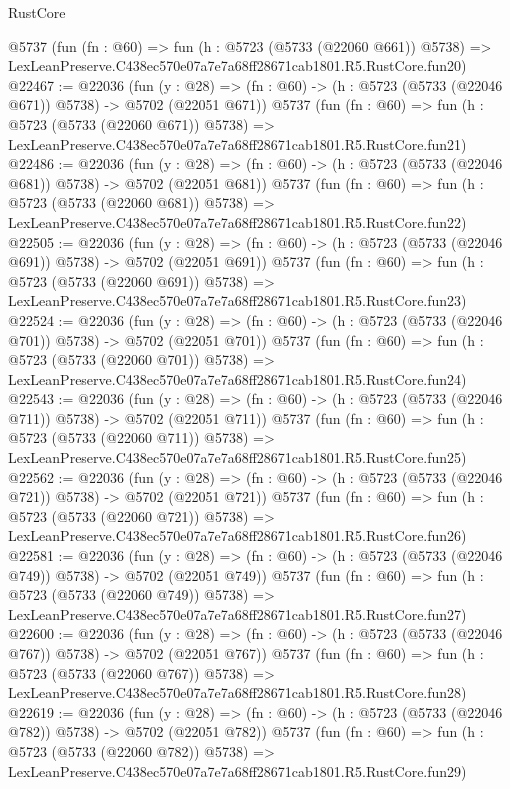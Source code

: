 \begin{lexlean}{RustCore}
\begin{coremodule}
    @5737
    (fun (fn : @60) =>
    fun (h : @5723 (@5733 (@22060 @661)) @5738) =>
    LexLeanPreserve.C438ec570e07a7e7a68ff28671cab1801.R5.RustCore.fun20)
@22467 := @22036
    (fun (y : @28) => (fn : @60) -> (h : @5723 (@5733 (@22046 @671)) @5738) -> @5702 (@22051 @671))
    @5737
    (fun (fn : @60) =>
    fun (h : @5723 (@5733 (@22060 @671)) @5738) =>
    LexLeanPreserve.C438ec570e07a7e7a68ff28671cab1801.R5.RustCore.fun21)
@22486 := @22036
    (fun (y : @28) => (fn : @60) -> (h : @5723 (@5733 (@22046 @681)) @5738) -> @5702 (@22051 @681))
    @5737
    (fun (fn : @60) =>
    fun (h : @5723 (@5733 (@22060 @681)) @5738) =>
    LexLeanPreserve.C438ec570e07a7e7a68ff28671cab1801.R5.RustCore.fun22)
@22505 := @22036
    (fun (y : @28) => (fn : @60) -> (h : @5723 (@5733 (@22046 @691)) @5738) -> @5702 (@22051 @691))
    @5737
    (fun (fn : @60) =>
    fun (h : @5723 (@5733 (@22060 @691)) @5738) =>
    LexLeanPreserve.C438ec570e07a7e7a68ff28671cab1801.R5.RustCore.fun23)
@22524 := @22036
    (fun (y : @28) => (fn : @60) -> (h : @5723 (@5733 (@22046 @701)) @5738) -> @5702 (@22051 @701))
    @5737
    (fun (fn : @60) =>
    fun (h : @5723 (@5733 (@22060 @701)) @5738) =>
    LexLeanPreserve.C438ec570e07a7e7a68ff28671cab1801.R5.RustCore.fun24)
@22543 := @22036
    (fun (y : @28) => (fn : @60) -> (h : @5723 (@5733 (@22046 @711)) @5738) -> @5702 (@22051 @711))
    @5737
    (fun (fn : @60) =>
    fun (h : @5723 (@5733 (@22060 @711)) @5738) =>
    LexLeanPreserve.C438ec570e07a7e7a68ff28671cab1801.R5.RustCore.fun25)
@22562 := @22036
    (fun (y : @28) => (fn : @60) -> (h : @5723 (@5733 (@22046 @721)) @5738) -> @5702 (@22051 @721))
    @5737
    (fun (fn : @60) =>
    fun (h : @5723 (@5733 (@22060 @721)) @5738) =>
    LexLeanPreserve.C438ec570e07a7e7a68ff28671cab1801.R5.RustCore.fun26)
@22581 := @22036
    (fun (y : @28) => (fn : @60) -> (h : @5723 (@5733 (@22046 @749)) @5738) -> @5702 (@22051 @749))
    @5737
    (fun (fn : @60) =>
    fun (h : @5723 (@5733 (@22060 @749)) @5738) =>
    LexLeanPreserve.C438ec570e07a7e7a68ff28671cab1801.R5.RustCore.fun27)
@22600 := @22036
    (fun (y : @28) => (fn : @60) -> (h : @5723 (@5733 (@22046 @767)) @5738) -> @5702 (@22051 @767))
    @5737
    (fun (fn : @60) =>
    fun (h : @5723 (@5733 (@22060 @767)) @5738) =>
    LexLeanPreserve.C438ec570e07a7e7a68ff28671cab1801.R5.RustCore.fun28)
@22619 := @22036
    (fun (y : @28) => (fn : @60) -> (h : @5723 (@5733 (@22046 @782)) @5738) -> @5702 (@22051 @782))
    @5737
    (fun (fn : @60) =>
    fun (h : @5723 (@5733 (@22060 @782)) @5738) =>
    LexLeanPreserve.C438ec570e07a7e7a68ff28671cab1801.R5.RustCore.fun29)

\end{coremodule}
\end{lexlean}
